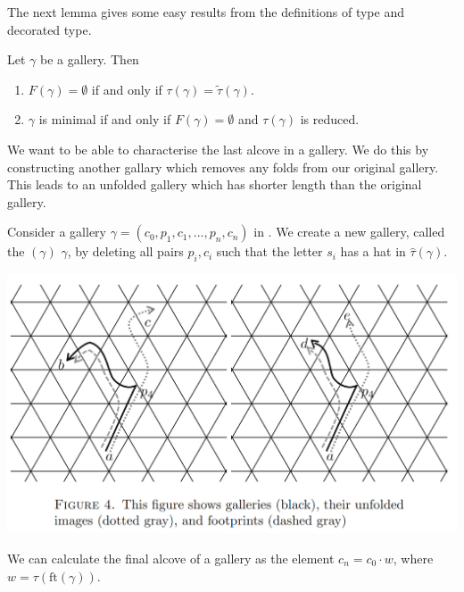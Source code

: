 \documentclass[11pt]{article}
\begin{document}
The next lemma gives some easy results from the definitions of type and decorated type. 

\begin{lemma}\cite[p.128]{SHA}
    Let $\gamma$ be a gallery. Then
    \begin{enumerate}
        \item $F(\gamma)=\emptyset$ if and only if $\tau(\gamma)=\tilde{\tau}(\gamma).$
        \item $\gamma$ is minimal if and only if $F(\gamma)=\emptyset$ and $\tau(\gamma)$ is reduced.
    \end{enumerate}
\end{lemma}

We want to be able to characterise the last alcove in a gallery. We do this by constructing another gallary which removes any folds from our original gallery. This leads to an unfolded gallery which has shorter length than the original gallery.

\begin{definition}
    Consider a gallery $\gamma = (c_0,p_1,c_1,...,p_n,c_n)$ in \sg. We create a new gallery, called the  $(\gamma)$  $\gamma$, by deleting all pairs $p_i,c_i$ such that the letter $s_i$ has a hat in $\hat{\tau}(\gamma)$. 

\end{definition}

\includegraphics[scale=0.6]{Screenshot 2023-02-03 133522.png}\\

\begin{lemma}
    We can calculate the final alcove of a gallery as the element $c_n=c_0\cdot w$, where $w=\tau(\text{ft}(\gamma))$.
\end{lemma}
\end{document}
